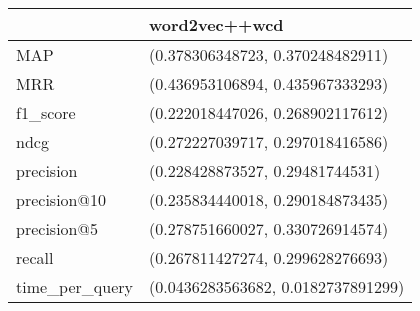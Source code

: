\begin{tabular}{ll}
\toprule
{} &                       word2vec++wcd \\
\midrule
MAP            &    (0.378306348723, 0.370248482911) \\
MRR            &    (0.436953106894, 0.435967333293) \\
f1\_score       &    (0.222018447026, 0.268902117612) \\
ndcg           &    (0.272227039717, 0.297018416586) \\
precision      &     (0.228428873527, 0.29481744531) \\
precision@10   &    (0.235834440018, 0.290184873435) \\
precision@5    &    (0.278751660027, 0.330726914574) \\
recall         &    (0.267811427274, 0.299628276693) \\
time\_per\_query &  (0.0436283563682, 0.0182737891299) \\
\bottomrule
\end{tabular}
